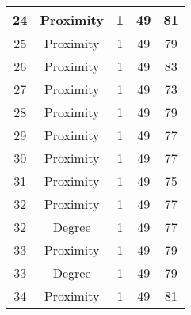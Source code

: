 \documentclass[results.tex]{subfiles}
\begin{document}
\begin{center}
\begin{tabular}{| c || c | c | c | c |}
            \hline
            24                      & Proximity                    & 1                      & 49                      & 81                   \\
            \hline
            25                      & Proximity                    & 1                      & 49                      & 79                   \\
            \hline
            26                      & Proximity                    & 1                      & 49                      & 83                   \\
            \hline
            27                      & Proximity                    & 1                      & 49                      & 73                   \\
            \hline
            28                      & Proximity                    & 1                      & 49                      & 79                   \\
            \hline
            29                      & Proximity                    & 1                      & 49                      & 77                   \\
            \hline
            30                      & Proximity                    & 1                      & 49                      & 77                   \\
            \hline
            31                      & Proximity                    & 1                      & 49                      & 75                   \\
            \hline
            32                      & Proximity                    & 1                      & 49                      & 77                   \\
            \hline
            32                      & Degree                       & 1                      & 49                      & 77                   \\
            \hline
            33                      & Proximity                    & 1                      & 49                      & 79                   \\
            \hline
            33                      & Degree                       & 1                      & 49                      & 79                   \\
            \hline
            34                      & Proximity                    & 1                      & 49                      & 81                   \\

\end{tabular}
\end{center}
\end{document}
